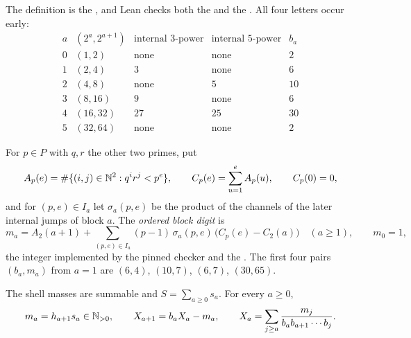 \documentclass[11pt]{article}
\begin{document}
\noindent The definition is the
, and Lean checks both the
 and the
.  All four letters occur early:
\[
\begin{array}{c|c|c|c|c}
a & (2^{a},2^{a+1}) & \text{internal }3\text{-power} & \text{internal }5\text{-power} & b_a\\ \hline
0 & (1,2)   & \text{none} & \text{none} & 2\\
1 & (2,4)   & 3           & \text{none} & 6\\
2 & (4,8)   & \text{none} & 5           & 10\\
3 & (8,16)  & 9           & \text{none} & 6\\
4 & (16,32) & 27          & 25          & 30\\
5 & (32,64) & \text{none} & \text{none} & 2
\end{array}
\]

For $p\in P$ with $q,r$ the other two primes, put
\[
 A_p(e)=\#\{(i,j)\in\mathbb{N}^2:q^{i}r^{j}<p^{e}\},\qquad
 C_p(e)=\sum_{u=1}^{e}A_p(u),\qquad C_p(0)=0 ,
\]
and for $(p,e)\in I_a$ let $\sigma_a(p,e)$ be the product of the channels of
the later internal jumps of block $a$.  The \emph{ordered block digit} is
\begin{equation}\label{long269:eq:actual-digit}
 m_a=A_2(a+1)+\sum_{(p,e)\in I_a}(p-1)\,\sigma_a(p,e)\,
        \bigl(C_p(e)-C_2(a)\bigr)\quad(a\ge1),
 \qquad m_0=1 ,
\end{equation}
the integer implemented by the pinned checker and the
.  The first four pairs $(b_a,m_a)$ from $a=1$ are
$(6,4)$, $(10,7)$, $(6,7)$, $(30,65)$.

\begin{theorem}\label{long269:res:actual-orbit}
The shell masses are summable and $S=\sum_{a\ge0}s_a$.  For every $a\ge0$,
\begin{equation}\label{long269:eq:shell-digit-identity}
 m_a=h_{a+1}s_a\in\N_{>0},
 \qquad
 X_{a+1}=b_aX_a-m_a,
 \qquad
 X_a=\sum_{j\ge a}\frac{m_j}{b_ab_{a+1}\cdots b_j} .
\end{equation}
\end{theorem}
\end{document}

